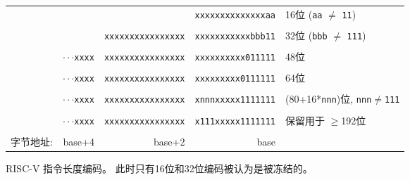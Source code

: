 \begin{figure}[hbt]
{
\begin{center}
\begin{tabular}{ccccl}
\cline{4-4}
& & & \multicolumn{1}{|c|}{\tt xxxxxxxxxxxxxxaa} & 16位 ({\tt aa}
$\neq$ {\tt 11})\\
\cline{4-4}
\\
\cline{3-4}
& & \multicolumn{1}{|c|}{\tt xxxxxxxxxxxxxxxx}
& \multicolumn{1}{c|}{\tt xxxxxxxxxxxbbb11} & 32位 ({\tt bbb}
$\neq$ {\tt 111}) \\
\cline{3-4}
\\
\cline{2-4}
\hspace{0.1in} 
& \multicolumn{1}{c|}{$\cdot\cdot\cdot${\tt xxxx} }
& \multicolumn{1}{c|}{\tt xxxxxxxxxxxxxxxx}
& \multicolumn{1}{c|}{\tt xxxxxxxxxx011111} & 48位 \\
\cline{2-4}
\\
\cline{2-4}
\hspace{0.1in} 
& \multicolumn{1}{c|}{$\cdot\cdot\cdot${\tt xxxx} }
& \multicolumn{1}{c|}{\tt xxxxxxxxxxxxxxxx}
& \multicolumn{1}{c|}{\tt xxxxxxxxx0111111} & 64位 \\
\cline{2-4}
\\
\cline{2-4}
\hspace{0.1in} 
& \multicolumn{1}{c|}{$\cdot\cdot\cdot${\tt xxxx} }
& \multicolumn{1}{c|}{\tt xxxxxxxxxxxxxxxx}
& \multicolumn{1}{c|}{\tt xnnnxxxxx1111111} & (80+16*{\tt nnn})位,
       {\tt nnn}$\neq${\tt 111} \\
\cline{2-4}
\\
\cline{2-4}
\hspace{0.1in} 
& \multicolumn{1}{c|}{$\cdot\cdot\cdot${\tt xxxx} }
& \multicolumn{1}{c|}{\tt xxxxxxxxxxxxxxxx}
& \multicolumn{1}{c|}{\tt x111xxxxx1111111} & 保留用于 $\geq$192位 \\
\cline{2-4}
\\
字节地址: & \multicolumn{1}{r}{base+4} & \multicolumn{1}{r}{base+2} & \multicolumn{1}{r}{base} & \\
 \end{tabular}
\end{center}
}
\caption{RISC-V 指令长度编码。 此时只有16位和32位编码被认为是被冻结的。}
\label{instlengthcode}
\end{figure}

